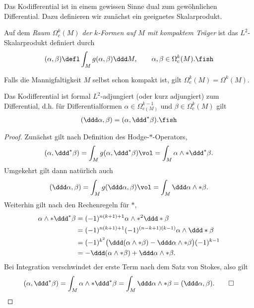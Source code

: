 \documentclass[%
	paper=a5,%
	fleqn,%
	DIV=18,%
	BCOR=0mm,
	fontsize=11pt,
	titlepage=false,%
	bibliography=totoc,
	DIV=18,%
	twoside=true,
	pdftitle=Riemannsche Geometrie,
	pdfauthor=Uwe Semmelmann,
	numbers=noendperiod]%
	{scrbook}
\begin{document}
Das Kodifferential ist in einem gewissen Sinne dual zum gewöhnlichen Differential. Dazu definieren wir zunächst ein geeignetes Skalarprodukt.

\begin{defn}
Auf dem \emph{Raum $\Omega_{c}^k(M)$ der $k$-Formen auf $M$ mit kompaktem Träger} ist das $L^2$-Skalarprodukt definiert durch
\begin{align*}
(\alpha,\beta)\defl \int_{M} g(\alpha,\beta)\ddd M,\qquad \alpha,\beta \in\Omega_{c}^k(M).\fish
\end{align*}
\end{defn}

Falls die Mannigfaltigkeit $M$ selbst schon kompakt ist, gilt $\Omega_{c}^k(M) = \Omega^k(M)$.

\begin{lem}
Das Kodifferential ist formal $L^2$-adjungiert (oder kurz adjungiert) zum Differential, d.h. für Differentialformen $\alpha\in\Omega^{k-1}_{c(M)}$ und $\beta\in\Omega^{k}_{c}(M)$ gilt
\begin{align*}
(\ddd\alpha,\beta) = (\alpha,\ddd^*\beta).\fish
\end{align*}
\end{lem}


\begin{proof}
Zunächst gilt nach Definition des Hodge-$*$-Operators,
\begin{align*}
(\alpha,\ddd^*\beta) = \int_{M} g(\alpha,\ddd^*\beta)\vol
= \int_{M} \alpha\wedge *\ddd^*\beta.
\end{align*}
Umgekehrt gilt dann natürlich auch
\begin{align*}
(\ddd\alpha,\beta) = \int_{M} g(\ddd\alpha,\beta)\vol = \int_{M} \ddd\alpha\wedge *\beta.
\end{align*}
Weiterhin gilt nach den Rechenregeln für $*$,
\begin{align*}
\alpha\wedge *\ddd^*\beta &= (-1)^{n(k+1)+1}\alpha\wedge *^2\ddd *\beta\\
&= (-1)^{n(k+1)+1}(-1)^{(n-k+1)(k-1)}\alpha\wedge \ddd *\beta\\
&= (-1)^{k^2}\bigl(\ddd(\alpha\wedge *\beta) - \ddd \alpha\wedge *\beta\bigr)(-1)^{k-1}\\
&=-\ddd(\alpha\wedge *\beta) + \ddd \alpha\wedge *\beta.
\end{align*}
Bei Integration verschwindet der erste Term nach dem Satz von Stokes, also gilt
\begin{align*}
(\alpha,\ddd^*\beta) = 
\int_{M} \alpha\wedge *\ddd^*\beta = 
\int_{M} \ddd \alpha\wedge *\beta = (\ddd\alpha,\beta).\qed
\end{align*}
\end{proof}
\end{document}
